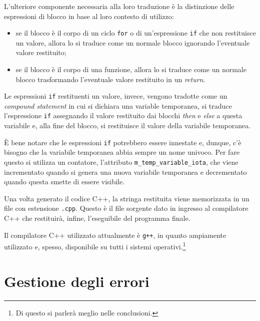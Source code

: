 L'ulteriore componente necessaria alla loro traduzione \`e la distinzione delle espressioni di blocco in base al loro contesto di utilizzo:
\begin{itemize}
	\item se il blocco \`e il corpo di un ciclo \texttt{for} o di un'espressione \texttt{if} che non restituisce un valore, allora lo si traduce come un normale blocco ignorando l'eventuale valore restituito;
	\item se il blocco \`e il corpo di una funzione, allora lo si traduce come un normale blocco trasformando l'eventuale valore restituito in un \textit{return}.
\end{itemize}


Le espressioni \texttt{if} restituenti un valore, invece, vengono tradotte come un \textit{compound statement} in cui si dichiara una variable temporanea, si traduce l'espressione \texttt{if} assegnando il valore restituito dai blocchi \textit{then} e \textit{else} a questa variabile e, alla fine del blocco, si restituisce il valore della variabile temporanea.

\`E bene notare che le espressioni \texttt{if} potrebbero essere innestate e, dunque, c'\`e bisogno che la variabile temporanea abbia sempre un nome univoco. Per fare questo si utilizza un contatore, l'attributo \texttt{m\_temp\_variable\_iota}, che viene incrementato quando si genera una nuova variabile temporanea e decrementato quando questa smette di essere visibile.


Una volta generato il codice C++, la stringa restituita viene memorizzata in un file con estensione \texttt{.cpp}. Questo \`e il file sorgente dato in ingresso al compilatore C++ che restituir\`a, infine, l'eseguibile del programma finale.

Il compilatore C++ utilizzato attualmente \`e \texttt{g++}, in quanto ampiamente utilizzato e, spesso, disponibile su tutti i sistemi operativi.\footnote{Di questo si parler\`a meglio nelle conclusioni.}

\section{Gestione degli errori}
\label{sec:gestione-degli-errori}
